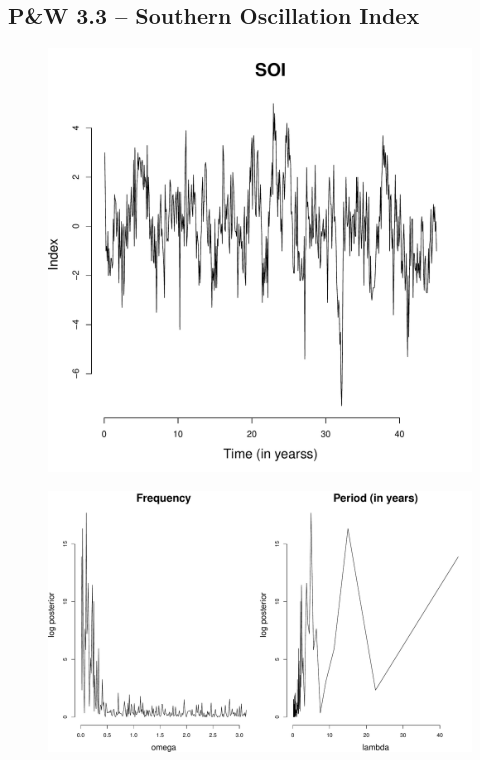 \documentclass[12pt]{article}
\begin{document}
\subsection*{P\&W 3.3 -- Southern Oscillation Index}

\begin{figure}[H]
\begin{center}
\includegraphics[scale=0.40]{dat_soi.pdf}
\end{center}
\end{figure}

\begin{figure}[H]
\begin{center}
\includegraphics[scale=0.40]{fp_soi.pdf}
\end{center}
\end{figure}
\end{document}
